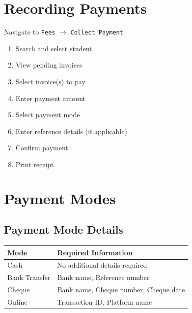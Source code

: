 \documentclass[12pt,a4paper]{report}
\begin{document}
\section{Recording Payments}

Navigate to \texttt{Fees} $\rightarrow$ \texttt{Collect Payment}

\begin{enumerate}[leftmargin=*]
    \item Search and select student
    \item View pending invoices
    \item Select invoice(s) to pay
    \item Enter payment amount
    \item Select payment mode
    \item Enter reference details (if applicable)
    \item Confirm payment
    \item Print receipt
\end{enumerate}

\section{Payment Modes}

\begin{center}
\end{center}

\subsection{Payment Mode Details}

\begin{longtable}{@{}p{3cm}p{10cm}@{}}
\toprule
\textbf{Mode} & \textbf{Required Information} \\
\midrule
\endhead
Cash & No additional details required \\
Bank Transfer & Bank name, Reference number \\
Cheque & Bank name, Cheque number, Cheque date \\
Online & Transaction ID, Platform name \\
\bottomrule
\end{longtable}
\end{document}
